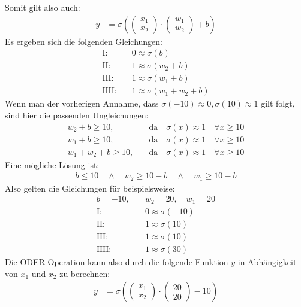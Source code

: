 \documentclass[a4paper]{report}
\begin{document}
Somit gilt also auch:
\begin{align}
    y&=\sigma\left(\begin{pmatrix}
        x_1 \\
        x_2
    \end{pmatrix}\cdot
    \begin{pmatrix}
        w_1 \\
        w_2
    \end{pmatrix}+b\right)
\end{align}
Es ergeben sich die folgenden Gleichungen:
\begin{align}
    \text{I:}&\quad 0\approx\sigma(b) \\
    \text{II:}&\quad 1\approx\sigma(w_2+b) \\
    \text{III:}&\quad 1\approx\sigma(w_1+b) \\
    \text{IIII:}&\quad 1\approx\sigma(w_1+w_2+b)
\end{align}
Wenn man der vorherigen Annahme, dass $\sigma(-10)\approx 0,\sigma(10)\approx 1$ gilt folgt, sind hier die passenden Ungleichungen:
\begin{align}
    w_2+b\geq 10,&\quad\text{da}\quad\sigma(x)\approx 1\quad\forall x\geq 10 \\
    w_1+b\geq 10,&\quad\text{da}\quad\sigma(x)\approx 1\quad\forall x\geq 10 \\
    w_1+w_2+b\geq10,&\quad\text{da}\quad\sigma(x)\approx 1\quad\forall x\geq 10
\end{align}
Eine mögliche Lösung ist:
\begin{align}
    b\leq 10 \quad\land\quad w_2\geq 10-b \quad\land\quad w_1\geq 10-b
\end{align}
Also gelten die Gleichungen für beispielsweise:
\begin{align}
    b=-10,&\quad w_2=20,\quad w_1=20 \\
    \text{I:}&\quad 0\approx\sigma(-10) \\
    \text{II:}&\quad 1\approx\sigma(10) \\
    \text{III:}&\quad 1\approx\sigma(10) \\
    \text{IIII:}&\quad 1\approx\sigma(30)
\end{align}
Die ODER-Operation kann also durch die folgende Funktion $y$ in Abhängigkeit von $x_1$ und $x_2$ zu berechnen:
\begin{align}
    y&=\sigma\left(\begin{pmatrix}
        x_1 \\
        x_2
    \end{pmatrix}\cdot
    \begin{pmatrix}
        20 \\
        20
    \end{pmatrix}-10\right)
\end{align}

\listoffigures
\end{document}
